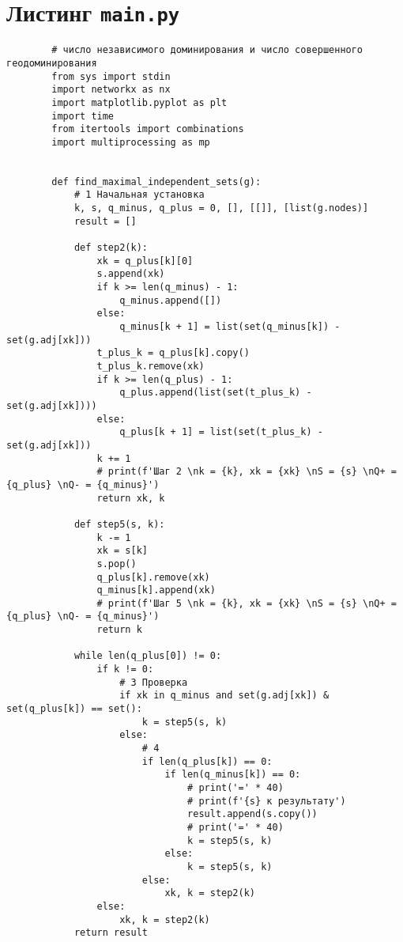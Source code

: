 \documentclass[bachelor, och, nir]{SCWorks}
\begin{document}
    \section{Листинг \texttt{main.py}}
    \begin{verbatim}
        # число независимого доминирования и число совершенного геодоминирования
        from sys import stdin
        import networkx as nx
        import matplotlib.pyplot as plt
        import time
        from itertools import combinations
        import multiprocessing as mp
        
        
        def find_maximal_independent_sets(g):
            # 1 Начальная установка
            k, s, q_minus, q_plus = 0, [], [[]], [list(g.nodes)]
            result = []
        
            def step2(k):
                xk = q_plus[k][0]
                s.append(xk)
                if k >= len(q_minus) - 1:
                    q_minus.append([])
                else:
                    q_minus[k + 1] = list(set(q_minus[k]) - set(g.adj[xk]))
                t_plus_k = q_plus[k].copy()
                t_plus_k.remove(xk)
                if k >= len(q_plus) - 1:
                    q_plus.append(list(set(t_plus_k) - set(g.adj[xk])))
                else:
                    q_plus[k + 1] = list(set(t_plus_k) - set(g.adj[xk]))
                k += 1
                # print(f'Шаг 2 \nk = {k}, xk = {xk} \nS = {s} \nQ+ = {q_plus} \nQ- = {q_minus}')
                return xk, k
        
            def step5(s, k):
                k -= 1
                xk = s[k]
                s.pop()
                q_plus[k].remove(xk)
                q_minus[k].append(xk)
                # print(f'Шаг 5 \nk = {k}, xk = {xk} \nS = {s} \nQ+ = {q_plus} \nQ- = {q_minus}')
                return k
        
            while len(q_plus[0]) != 0:
                if k != 0:
                    # 3 Проверка
                    if xk in q_minus and set(g.adj[xk]) & set(q_plus[k]) == set():
                        k = step5(s, k)
                    else:
                        # 4
                        if len(q_plus[k]) == 0:
                            if len(q_minus[k]) == 0:
                                # print('=' * 40)
                                # print(f'{s} к результату')
                                result.append(s.copy())
                                # print('=' * 40)
                                k = step5(s, k)
                            else:
                                k = step5(s, k)
                        else:
                            xk, k = step2(k)
                else:
                    xk, k = step2(k)
            return result
        

\end{verbatim}
\end{document}
